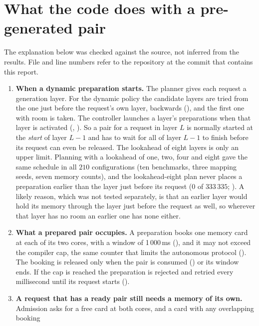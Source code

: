 \section{What the code does with a pre-generated pair}
\label{sec:code-reading}
The explanation below was checked against the source, not inferred from the results. File and line numbers refer to the repository at the commit that contains this report.

\begin{enumerate}
  \item \textbf{When a dynamic preparation starts.} The planner gives each request a generation layer. For the dynamic policy the candidate layers are tried from the one just
    before the request's own layer, backwards (), and the first one with room is taken. The controller launches a layer's preparations when that layer is
    activated (, ). So a pair for a request in layer $L$ is normally started at the \emph{start} of layer $L-1$
    and has to wait for all of layer $L-1$ to finish before its request can even be released. The lookahead of eight layers is only an upper limit. Planning with a lookahead of one, two, four and eight gave the same schedule in all $210$ configurations (ten benchmarks, three mapping seeds, seven memory counts), and the lookahead-eight plan
    never places a preparation earlier than the layer just before its request ($0$ of $333\,335$; ). A likely reason, which was not tested separately, is that an earlier layer would hold its memory
    through the layer just before the request as well, so wherever that layer has no room an earlier one has none either.
  \item \textbf{What a prepared pair occupies.} A preparation books one memory card at each of its two cores, with a window of 1\,000\,ms
    (), and it may not exceed the compiler cap, the same counter that limits the autonomous protocol
    (). The booking is released only when the pair is consumed () or its window ends.
    If the cap is reached the preparation is rejected and retried every millisecond until its request starts ().
  \item \textbf{A request that has a ready pair still needs a memory of its own.} Admission asks for a free card at both cores, and a card with any overlapping booking

\end{enumerate}
